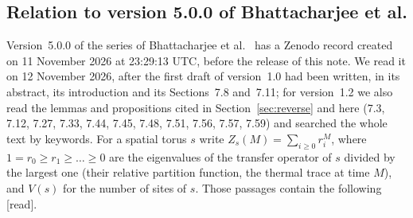 \documentclass[11pt,a4paper]{article}
\theoremstyle{plain}
\theoremstyle{definition}
\theoremstyle{remark}
\numberwithin{equation}{section}
\newcommand{\st}[1]{\textsf{[#1]}}
\begin{document}
\subsection{Relation to version 5.0.0 of Bhattacharjee et al.}\label{sec:bb26v5}
Version~5.0.0 of the series of Bhattacharjee et al.\ \cite{BB26v5} has a Zenodo record created on 11 November 2026 at 23:29:13 UTC, before
the release of this note. We read it on 12 November 2026, after the first draft of version~1.0 had been written, in its abstract, its
introduction and its Sections~7.8 and~7.11; for version~1.2 we also read the lemmas and propositions cited in Section~\ref{sec:reverse} and here (7.3, 7.12, 7.27, 7.33, 7.44, 7.45, 7.48, 7.51, 7.56, 7.57, 7.59) and searched the whole text by keywords. For a spatial torus $s$ write $\widehat Z_s(M)=\sum_{i\ge0}r_i^M$, where $1=r_0\ge r_1\ge\dots\ge0$
are the eigenvalues of the transfer operator of $s$ divided by the largest one (their relative partition function, the thermal trace at
time $M$), and $V(s)$ for the number of sites of $s$. Those passages contain the following \st{read}.
\end{document}
